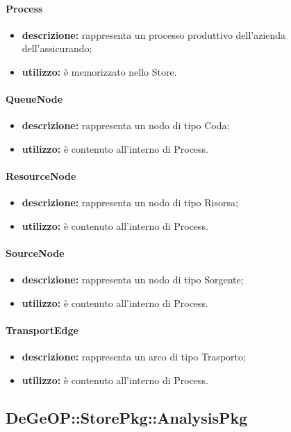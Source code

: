 \paragraph{Process}
\begin{itemize}
	\item \textbf{descrizione:} rappresenta un processo produttivo dell'azienda dell'assicurando;
	\item \textbf{utilizzo:} è memorizzato nello Store.
\end{itemize}
\paragraph{QueueNode}
\begin{itemize}
	\item \textbf{descrizione:} rappresenta un nodo di tipo Coda;
	\item \textbf{utilizzo:} è contenuto all'interno di Process.
\end{itemize}
\paragraph{ResourceNode}
\begin{itemize}
	\item \textbf{descrizione:} rappresenta un nodo di tipo Risorsa;
	\item \textbf{utilizzo:} è contenuto all'interno di Process.
\end{itemize}
\paragraph{SourceNode}
\begin{itemize}
	\item \textbf{descrizione:} rappresenta un nodo di tipo Sorgente;
	\item \textbf{utilizzo:} è contenuto all'interno di Process.
\end{itemize}
\paragraph{TransportEdge}
\begin{itemize}
	\item \textbf{descrizione:} rappresenta un arco di tipo Trasporto;
	\item \textbf{utilizzo:} è contenuto all'interno di Process.
\end{itemize}
\newpage
\subsection{DeGeOP::StorePkg::AnalysisPkg}
\label{pkg::AnalysisPkg}
